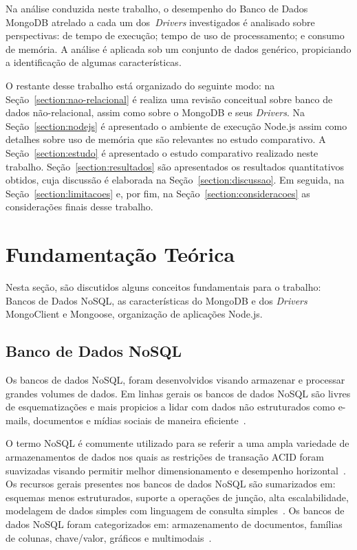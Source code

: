 \documentclass[12pt]{article}
\begin{document}
Na análise conduzida neste trabalho, o desempenho do Banco de Dados MongoDB atrelado a cada um dos~\emph{Drivers} investigados é analisado sobre perspectivas: de tempo de execução; tempo de uso de processamento; e consumo de memória. A análise é aplicada sob um conjunto de dados genérico, propiciando a identificação de algumas características.

O restante desse trabalho está organizado do seguinte modo: na Seção~\ref{section:nao-relacional} é realiza uma revisão conceitual sobre banco de dados não-relacional, assim como sobre o MongoDB e seus \emph{Drivers}. Na Seção~\ref{section:nodejs} é apresentado o ambiente de execução Node.js assim como detalhes sobre uso de memória que são relevantes no estudo comparativo. A Seção~\ref{section:estudo} é apresentado o estudo comparativo realizado neste trabalho. Seção~\ref{section:resultados} são apresentados os resultados quantitativos obtidos, cuja discussão é elaborada na Seção~\ref{section:discussao}. Em seguida, na Seção~\ref{section:limitacoes} e, por fim, na Seção~\ref{section:consideracoes} as considerações finais desse trabalho.

\section{Fundamentação Teórica}
\label{section:fundamentacao}

Nesta seção, são discutidos alguns conceitos fundamentais para o trabalho: Bancos de Dados NoSQL, as características do MongoDB e dos \emph{Drivers} MongoClient e Mongoose, organização de aplicações Node.js. 

\subsection{Banco de Dados NoSQL}
\label{subsection:nao-relacional}

Os bancos de dados NoSQL, foram desenvolvidos visando armazenar e processar grandes volumes de dados. Em linhas gerais os bancos de dados NoSQL são livres de esquematizações e mais propicios a lidar com dados não estruturados como e-mails, documentos e mídias sociais de maneira eficiente~\cite{mohamed:2014,ramesh:2016}.

O termo NoSQL é comumente utilizado para se referir a uma ampla variedade de armazenamentos de dados nos quais as restrições de transação ACID foram suavizadas visando permitir melhor dimensionamento e desempenho horizontal~\cite{rafique:2018}. Os recursos gerais presentes nos bancos de dados NoSQL são sumarizados em: esquemas menos estruturados, suporte a operações de junção, alta escalabilidade, modelagem de dados simples com linguagem de consulta simples~\cite{ramesh:2016}. Os bancos de dados NoSQL foram categorizados em: armazenamento de documentos, famílias de colunas, chave/valor, gráficos e multimodais~\cite{aparicio:2016}.
\end{document}
